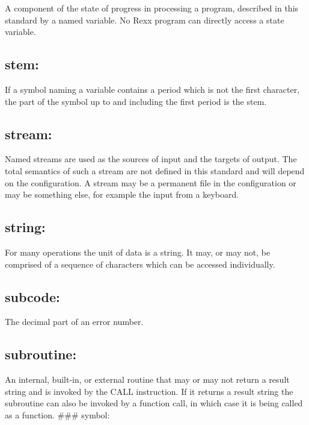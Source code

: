 A component of the state of progress in processing a program, described
in this standard by a named variable. No Rexx program can directly
access a state variable.

\hypertarget{stem}{%
\subsection{stem:}\label{stem}}

If a symbol naming a variable contains a period which is not the first
character, the part of the symbol up to and including the first period
is the stem.

\hypertarget{stream}{%
\subsection{stream:}\label{stream}}

Named streams are used as the sources of input and the targets of
output. The total semantics of such a stream are not defined in this
standard and will depend on the configuration. A stream may be a
permanent file in the configuration or may be something else, for
example the input from a keyboard.

\hypertarget{string}{%
\subsection{string:}\label{string}}

For many operations the unit of data is a string. It may, or may not, be
comprised of a sequence of characters which can be accessed
individually.

\hypertarget{subcode}{%
\subsection{subcode:}\label{subcode}}

The decimal part of an error number.

\hypertarget{subroutine}{%
\subsection{subroutine:}\label{subroutine}}

An internal, built-in, or external routine that may or may not return a
result string and is invoked by the CALL instruction. If it returns a
result string the subroutine can also be invoked by a function call, in
which case it is being called as a function. \#\#\# symbol:

